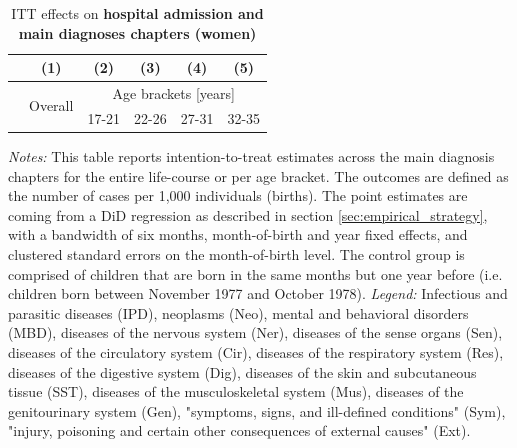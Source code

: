 \documentclass[11pt, a4paper]{article} %
\begin{document}
\newpage
{} 
\vspace*{\fill}
\begin{table}[H] \centering 
	\begin{threeparttable} \centering \caption{ITT effects on \textbf{hospital admission and main diagnoses chapters (women)}}\label{tab: ITT_across_chapters_per_age_group_women}
		{\def\sym#1{\ifmmode^{#1}\else\(^{#1}\)\fi} 
			\begin{tabular}{l*{5}{c}}
				\toprule 
				&\multicolumn{1}{c}{(1)}&\multicolumn{1}{c}{(2)}&\multicolumn{1}{c}{(3)}&\multicolumn{1}{c}{(4)}&\multicolumn{1}{c}{(5)}\\
				\midrule
				&\multirow{2}{*}{Overall} & \multicolumn{4}{c}{Age brackets [years]} \\ 
				\cmidrule(lr){3-6}
				&&\multicolumn{1}{c}{17-21}&\multicolumn{1}{c}{22-26}&\multicolumn{1}{c}{27-31}&\multicolumn{1}{c}{32-35}\\
				
				\midrule
				
				
				
				\bottomrule 
		\end{tabular}}
	\end{threeparttable} 
	\begin{minipage}{0.9\linewidth}
		\scriptsize \emph{Notes:} This table reports intention-to-treat estimates across the main diagnosis chapters for the entire life-course or per age bracket. The outcomes are defined as the number of cases per 1,000 individuals (births). The point estimates are coming from a DiD regression as described in section \ref{sec:empirical_strategy}, with a bandwidth of six months, month-of-birth and year fixed effects, and clustered standard errors on the month-of-birth level. The control group is comprised of children that are born in the same months but one year before (i.e. children born between November 1977 and October 1978).\newline
		\emph{Legend:} Infectious and parasitic diseases (IPD), neoplasms (Neo), mental and behavioral disorders (MBD), diseases of the nervous system (Ner), diseases of the sense organs (Sen), diseases of the circulatory system (Cir), diseases of the respiratory system (Res), diseases of the digestive system (Dig), diseases of the skin and subcutaneous tissue (SST), diseases of the musculoskeletal system (Mus), diseases of the genitourinary system (Gen), "symptoms, signs, and ill-defined conditions" (Sym), "injury, poisoning and certain other consequences of external causes" (Ext).
	\end{minipage}
\end{table} 
\vspace*{\fill}\clearpage 
\restoregeometry
\end{document}
